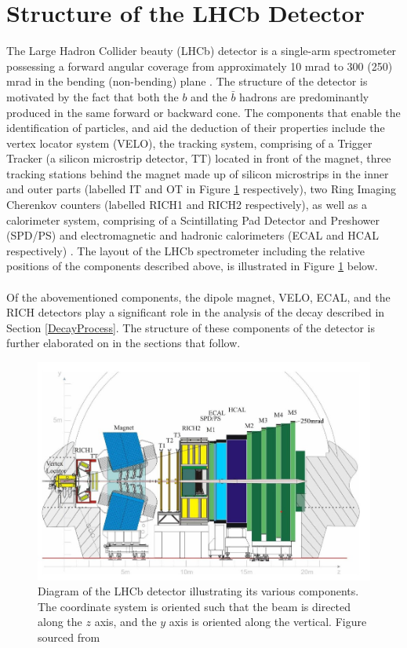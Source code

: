 \section{Structure of the LHCb Detector}
The Large Hadron Collider beauty (LHCb) detector is a single-arm spectrometer possessing a forward angular coverage from
approximately 10 mrad to 300 (250) mrad in the bending (non-bending) plane \cite{https://doi.org/10.48550/arxiv.0910.1740}.
The structure of the detector is motivated by the fact that both the $b$ and the $\bar{b}$ hadrons are predominantly produced in the
same forward or backward cone. The components that enable the identification of particles, and aid the deduction of their properties include
the vertex locator system (VELO), the tracking system, comprising of a Trigger Tracker (a silicon microstrip detector, TT) located in front 
of the magnet, three tracking stations behind the magnet made up of silicon microstrips in the inner and outer parts (labelled IT and OT in Figure \ref{LHCbDetector} respectively),
two Ring Imaging Cherenkov counters (labelled RICH1 and RICH2 respectively), as well as a calorimeter system, comprising of a Scintillating Pad Detector and Preshower
(SPD/PS) and electromagnetic and hadronic calorimeters (ECAL and HCAL respectively) \cite{https://doi.org/10.48550/arxiv.0910.1740}. The layout of the LHCb spectrometer including the relative positions of the components described above, is illustrated in Figure \ref{LHCbDetector} below.\\
\\
Of the abovementioned components, the dipole magnet, VELO, ECAL, and the RICH detectors play a significant role
in the analysis of the decay described in Section \ref{DecayProcess}. The structure of these components of the
detector is further elaborated on in the sections that follow.
\begin{figure}[H]
    \centering
    \includegraphics[scale = 0.45]{LHCbDetector.jpg}
    \caption{Diagram of the LHCb detector illustrating its various components. The coordinate system is oriented such that the beam is directed along the $z$ axis, and the $y$ axis is oriented along the vertical. Figure sourced from \cite{AbellanBeteta:2020amj}}
    \label{LHCbDetector}
\end{figure}
